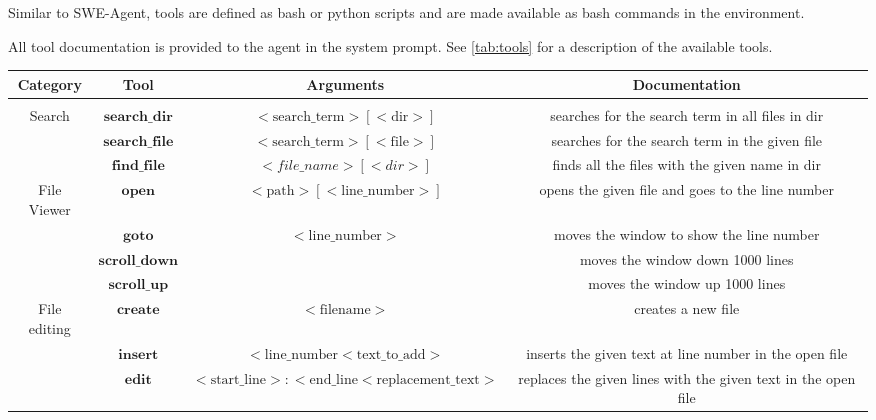 Similar to SWE-Agent, tools are defined as bash or python scripts and are made available as bash commands in the environment.

All tool documentation is provided to the agent in the system prompt. See \autoref{tab:tools} for a description of the available tools.


\begin{table*}[!h]
    \centering
    \begin{adjustbox}{width=1.0\textwidth}
    \begin{NiceTabular}{cccc}
        \toprule
        Category & Tool & Arguments & Documentation \\
        \midrule
         \\
        \midrule
                Search & $\textbf{search\_dir}$  & $\mathrm{<search\_term> [<dir>]}$ & searches for the search term in all files in dir \\
               & $\textbf{search\_file}$ & $\mathrm{<search\_term> [<file>]}$ & searches for the search term in the given file \\
               & $\textbf{find\_file}$   & $<file\_name> [<dir>]$ & finds all the files with the given name in dir  \\
        \midrule
        File Viewer & $\textbf{open}$ & $\mathrm{<path> [<line\_number>]}$  & opens the given file and goes to the line number \\
                    & $\textbf{goto}$ & $\mathrm{<line\_number>}$ & moves the window to show the line number \\
                    & $\textbf{scroll\_down}$ &  & moves the window down 1000 lines \\
                    & $\textbf{scroll\_up}$ &  & moves the window up 1000 lines \\
        \midrule
        File editing & $\textbf{create}$ & $\mathrm{<filename>}$ & creates a new file \\
                     & $\textbf{insert}$ & $\mathrm{<line\_number <text\_to\_add>}$ & inserts the given text at line number in the open file \\
                     & $\textbf{edit}$ & $\mathrm{<start\_line>:<end\_line <replacement\_text>}$ & replaces the given lines with the given text in the open file \\

\end{NiceTabular}
\end{adjustbox}
\end{table*}
